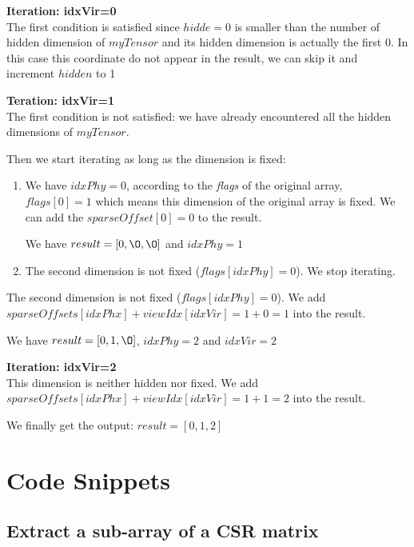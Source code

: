 	\textbf{Iteration: idxVir=0}\\
	The first condition is satisfied since $hidde=0$ is smaller than the number of hidden dimension of $myTensor$ and its hidden dimension is actually the first 0. In this case this coordinate do not appear in the result, we can skip it and increment $hidden$ to 1
	
	\textbf{Teration: idxVir=1}\\
	The first condition is not satisfied: we have already encountered all the hidden dimensions of $myTensor$.
	
	Then we start iterating as long as the dimension is fixed:
	\begin{enumerate}
		\item  We have $idxPhy=0$, according to the \textit{flags} of the original array, $flags[0] = 1$ which means this dimension of the original array is fixed. We can add the $sparseOffset[0] = 0$ to the result.
		
		We have $result = [0, \O, \O]$ and $idxPhy=1$
		
		\item The second dimension is not fixed ($flags[idxPhy] = 0$). We stop iterating.
	\end{enumerate}
	
	The second dimension is not fixed ($flags[idxPhy] = 0$).  We add $sparseOffsets[idxPhx] + viewIdx[idxVir] = 1 + 0 =  1$ into the result.
	
	We have $result = [0, 1, \O]$, $idxPhy=2$ and $idxVir=2$
	
	\textbf{Iteration: idxVir=2}\\
	This dimension is neither hidden nor fixed. We add $sparseOffsets[idxPhx] + viewIdx[idxVir] = 1 + 1 =  2$ into the result.
	
	We finally get the output: $result = [0, 1, 2]$
	
\section{Code Snippets}
\label{ch:codesnip}
\subsection{Extract a sub-array of a CSR matrix}

